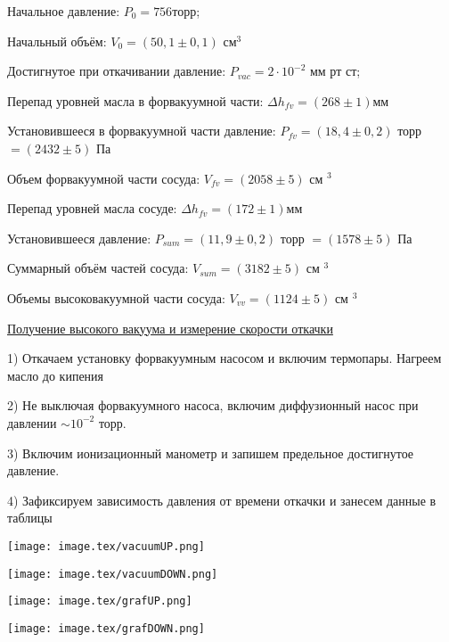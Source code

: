 \documentclass{article}
\begin{document}
Начальное давление: \(P_{0} = 756 торр\);

Начальный объём: \(V_{0} = (50,1 \pm 0,1)\) см\(^{3}\)

Достигнутое при откачивании давление: \(P_{vac} = 2\cdot10^{-2}\) мм рт ст;

Перепад уровней масла в форвакуумной части: \(\Delta h_{fv} = (268 \pm 1) \)мм

Установившееся в форвакуумной части давление: \(P_{fv} = (18,4 \pm 0,2)\) торр \(= (2432 \pm 5)\) Па

Объем форвакуумной части сосуда: \(V_{fv} = (2058 \pm 5)\) см \(^{3}\)

Перепад уровней масла сосуде: \(\Delta h_{fv} = (172 \pm 1) \)мм

Установившееся давление: \(P_{sum} = (11,9 \pm 0,2)\) торр \(= (1578 \pm 5)\) Па

Суммарный объём частей сосуда: \(V_{sum} = (3182 \pm 5)\) см \(^{3}\)

Объемы высоковакуумной части сосуда: \(V_{vv} = (1124 \pm 5)\) см \(^{3}\)

\begin{center}
    \raggedleft
    {
        \large{\underline{Получение высокого вакуума и измерение скорости откачки}}
    }
\end{center}

1) Откачаем установку форвакуумным насосом и включим термопары. Нагреем масло до кипения

2) Не выключая форвакуумного насоса, включим диффузионный насос при давлении \(\sim 10^{-2}\) торр.

3) Включим ионизационный манометр и запишем предельное достигнутое давление.

4) Зафиксируем зависимость давления от времени откачки и занесем данные в таблицы

\begin{center}
    \texttt{[image: image.tex/vacuumUP.png]}
\end{center}
\begin{center}
    \texttt{[image: image.tex/vacuumDOWN.png]}
\end{center}
\begin{center}
    \texttt{[image: image.tex/grafUP.png]}
\end{center}
\begin{center}
    \texttt{[image: image.tex/grafDOWN.png]}
\end{center}
\end{document}
